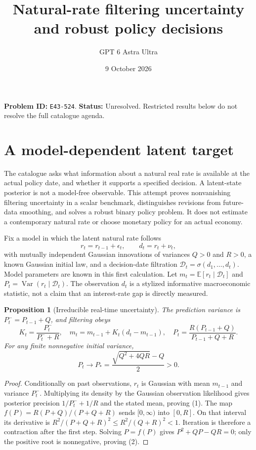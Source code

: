 \documentclass[11pt,a4paper]{article}
\title{Natural-rate filtering uncertainty and robust policy decisions}
\author{GPT 6 Astra Ultra}\date{9 October 2026}
\newtheorem{proposition}[theorem]{Proposition}
\newcommand{\E}{\mathbb E}
\DeclareMathOperator{\Var}{Var}
\begin{document}
\maketitle
\textbf{Problem ID:} \texttt{E43-524}. \textbf{Status:} Unresolved. Restricted results below do not resolve the full catalogue agenda.

\section{A model-dependent latent target}
The catalogue asks what information about a natural real rate is available at the actual policy date, and whether it supports a specified decision. A latent-state posterior is not a model-free observable. This attempt proves nonvanishing filtering uncertainty in a scalar benchmark, distinguishes revisions from future-data smoothing, and solves a robust binary policy problem. It does not estimate a contemporary natural rate or choose monetary policy for an actual economy.

Fix a model in which the latent natural rate follows
\[
 r_t=r_{t-1}+\epsilon_t,\qquad d_t=r_t+\nu_t,
\]
with mutually independent Gaussian innovations of variances $Q>0$ and $R>0$, a known Gaussian initial law, and a decision-date filtration $\mathcal D_t=\sigma(d_1,\ldots,d_t)$. Model parameters are known in this first calculation. Let $m_t=\E[r_t\mid\mathcal D_t]$ and $P_t=\Var(r_t\mid\mathcal D_t)$. The observation $d_t$ is a stylized informative macroeconomic statistic, not a claim that an interest-rate gap is directly measured.

\begin{proposition}[Irreducible real-time uncertainty]
The prediction variance is $P_t^-=P_{t-1}+Q$, and filtering obeys
\[
 K_t=\frac{P_t^-}{P_t^-+R},\quad
 m_t=m_{t-1}+K_t(d_t-m_{t-1}),\quad
 P_t=\frac{R(P_{t-1}+Q)}{P_{t-1}+Q+R}. \tag{1}
\]
For any finite nonnegative initial variance,
\[
 P_t\longrightarrow P_*=\frac{\sqrt{Q^2+4QR}-Q}{2}>0. \tag{2}
\]
\end{proposition}
\begin{proof}
Conditionally on past observations, $r_t$ is Gaussian with mean $m_{t-1}$ and variance $P_t^-$. Multiplying its density by the Gaussian observation likelihood gives posterior precision $1/P_t^-+1/R$ and the stated mean, proving (1). The map $f(P)=R(P+Q)/(P+Q+R)$ sends $[0,\infty)$ into $[0,R]$. On that interval its derivative is $R^2/(P+Q+R)^2\le R^2/(Q+R)^2<1$. Iteration is therefore a contraction after the first step. Solving $P=f(P)$ gives $P^2+QP-QR=0$; only the positive root is nonnegative, proving (2).
\end{proof}
\end{document}
